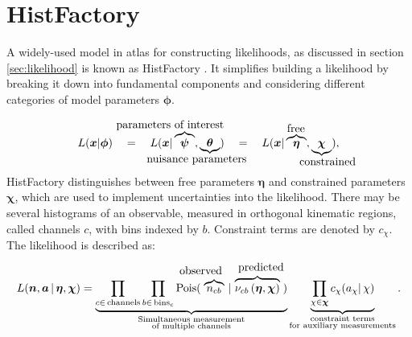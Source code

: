 \section{HistFactory}\label{sec:histfactory_model}
A widely-used model in \ac{atlas} for constructing likelihoods, as discussed in section \ref{sec:likelihood} is known as HistFactory \citep{cranmer2012histfactory}. It simplifies building a likelihood by breaking it down into fundamental components and considering different categories of model parameters $\bm{\phi}$.

\newcommand{\freeset}{\bm{\eta}}
\newcommand{\constrset}{\bm{\chi}}
\newcommand{\singleconstr}{\chi}
\newcommand{\channelcounts}{\bm{n}}
\newcommand{\auxdata}{\bm{a}}
\newcommand{\poiset}{\bm{\psi}}
\newcommand{\nuisset}{\bm{\theta}}
\newcommand{\fullset}{\bm{\phi}}
\newcommand{\singlefull}{\phi}
\begin{equation}
    L(\bm{x}|\fullset) \quad=\quad
    L(\bm{x}|\overbrace{\poiset}^{\llap{\text{parameters of interest}}},\underbrace{\nuisset}_{\llap{\text{nuisance parameters}}}) \quad=\quad
    L(\bm{x}|\overbrace{\freeset}^{\rlap{\text{free}}},\underbrace{\constrset}_{\rlap{\text{constrained}}}),
\end{equation}
HistFactory distinguishes between free parameters $\freeset$ and constrained parameters $\constrset$, which are used to implement uncertainties into the likelihood. There may be several histograms of an observable, measured in orthogonal kinematic regions, called channels $c$, with bins indexed by $b$. Constraint terms are denoted by $c_{\singleconstr}$. The likelihood is described as:
\begin{equation}
    L(\channelcounts, \auxdata \,|\,\freeset,\constrset)
    = \underbrace{{\prod_{c\in\mathrm{\,channels}} \prod_{b \in \mathrm{\,bins}_c}
                \textrm{Pois} (
                \;\overbrace{n_{cb}}^{\llap{\text{\strut observed}\quad\;}}
                \,|\, \overbrace{\nu_{cb}\left(\freeset,\constrset\right)}^{\llap{\quad\text{\strut predicted}}}
                \;)}}_{\substack{\text{Simultaneous measurement}\\%
            \text{of multiple channels}}}
    \underbrace{{\prod_{\singleconstr \in \constrset} c_{\singleconstr}(a_{\singleconstr} |\, \singleconstr)}}_{\substack{\text{constraint terms}\\%
            \text{for }\text{auxiliary measurements}}}.
    \label{eq:histfactory_likelihood}
\end{equation}

